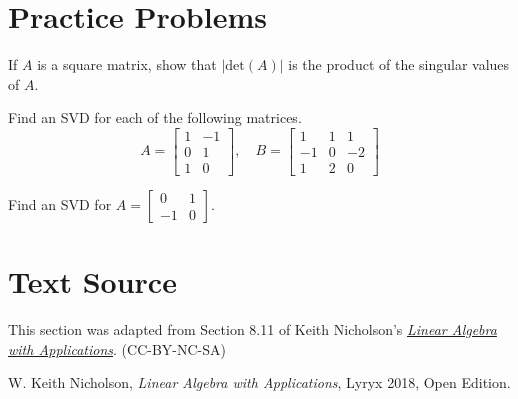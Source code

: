 \documentclass{ximera}
\begin{document}
\section*{Practice Problems}
\begin{problem}\label{prob:svd1}
    If $A$ is a square matrix, show that $|\text{det}(A)|$ is the product of the singular values of $A$.
\end{problem}

\begin{problem}\label{prob:svd2}
    Find an SVD for each of the following matrices.
    $$A=\begin{bmatrix}1 & -1\\0 & 1\\1 & 0\end{bmatrix},\quad B=\begin{bmatrix}1 & 1 & 1\\-1 & 0 & -2\\1 & 2 & 0\end{bmatrix}$$
\end{problem}  

\begin{problem}\label{prob:svd3}
    Find an SVD for $A=\begin{bmatrix}0 & 1\\-1 & 0\end{bmatrix}$.
\end{problem}

\section*{Text Source} This section was adapted from Section 8.11 of Keith Nicholson's \href{https://open.umn.edu/opentextbooks/textbooks/linear-algebra-with-applications}{\it Linear Algebra with Applications}. (CC-BY-NC-SA)

W. Keith Nicholson, {\it Linear Algebra with Applications}, Lyryx 2018, Open Edition.
\end{document}
